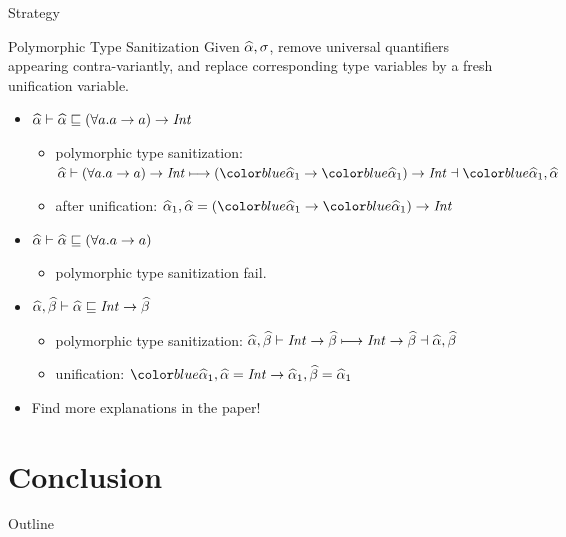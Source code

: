 \documentclass{beamer}
\begin{document}
\begin{frame}{Strategy}
  \begin{block}{Polymorphic Type Sanitization}
    Given $\widehat{\alpha}, \sigma$, remove universal quantifiers appearing
    contra-variantly, and replace corresponding type variables by a fresh
    unification variable.
  \end{block}
  \begin{itemize}
  \item<2-> $\widehat{\alpha} \vdash \widehat{\alpha} \sqsubseteq (\forall a. a \to a) \to \mathit{Int}$
    \begin{itemize}
      \item<3-> polymorphic type sanitization: $\genA \bycg (\forall a. a \to a) \to
        \Int \cgto (\hl{\genA_1} \to \hl{\genA_1}) \to \Int \dashv \hl{\genA_1}, \genA$
      \item<4-> after unification: $\genA_1, \genA = (\hl{\genA_1} \to \hl{\genA_1})
        \to \Int$
    \end{itemize}
  \item<5-> $\widehat{\alpha} \vdash \widehat{\alpha} \sqsubseteq (\forall a. a \to a)$
    \begin{itemize}
      \item<6-> polymorphic type sanitization \alert{fail.}
    \end{itemize}
  \item<7-> $\widehat{\alpha}, \widehat{\beta} \vdash \widehat{\alpha} \sqsubseteq \mathit{Int} \to \widehat{\beta}$
    \begin{itemize}
      \item<8-> polymorphic type sanitization: $\widehat{\alpha}, \widehat{\beta} \vdash \mathit{Int} \to \widehat{\beta}
        \longmapsto \mathit{Int} \to \widehat{\beta} \dashv \widehat{\alpha}, \widehat{\beta}$
      \item<9-> unification: $\hl{\genA_1}, \genA = \Int \to \genA_1, \genB = \genA_1$
    \end{itemize}
  \item<10-> Find more explanations in the paper!
  \end{itemize}
\end{frame}

\section{Conclusion}

\begin{frame}{Outline}
\tableofcontents[currentsection]
\end{frame}
\end{document}
